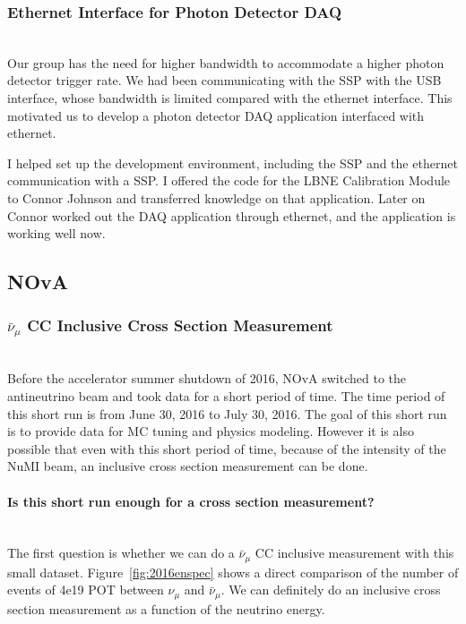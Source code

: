 \documentclass[12pt,a4paper,final]{iopart}
\begin{document}
\subsubsection{Ethernet Interface for Photon Detector DAQ}\hspace*{\fill}\\
Our group has the need for higher bandwidth to accommodate a higher photon detector trigger rate. We had been communicating with the SSP with the USB interface, whose bandwidth is limited compared with the ethernet interface. This motivated us to develop a photon detector DAQ application interfaced with ethernet.

I helped set up the development environment, including the SSP and the ethernet communication with a SSP. I offered the code for the LBNE Calibration Module to Connor Johnson and transferred knowledge on that application. Later on Connor worked out the DAQ application through ethernet, and the application is working well now.

\subsection{NOvA}

\subsubsection[numu bar CC Inclusive Cross Section Measurement]{$\bar{\nu}_\mu$ CC Inclusive Cross Section Measurement}\hspace*{\fill}\\
Before the accelerator summer shutdown of 2016, NOvA switched to the antineutrino beam and took data for a short period of time. The time period of this short run is from June 30, 2016 to July 30, 2016. The goal of this short run is to provide data for MC tuning and physics modeling. However it is also possible that even with this short period of time, because of the intensity of the NuMI beam, an inclusive cross section measurement can be done.

\paragraph{\textbf{Is this short run enough for a cross section measurement?}}\hspace*{\fill}\\
The first question is whether we can do a $\bar{\nu}_\mu$ CC inclusive measurement with this small dataset. Figure~\ref{fig:2016enspec} shows a direct comparison of the number of events of 4e19 POT between $\nu_\mu$ and $\bar{\nu}_\mu$. We can definitely do an inclusive cross section measurement as a function of the neutrino energy.
\end{document}
